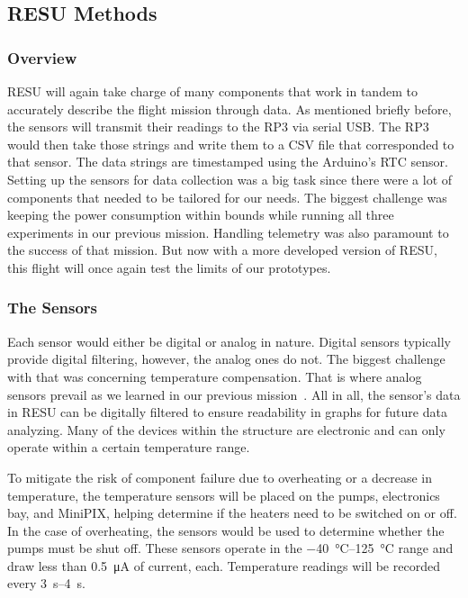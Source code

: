 \subsection{RESU Methods}
\label{sec:RESU}


\subsubsection{Overview}

RESU will again take charge of many components that work in tandem to accurately describe the flight mission through data.  As mentioned briefly before, the sensors will transmit their readings to the RP3 via serial USB.  The RP3 would then take those strings and write them to a CSV file that corresponded to that sensor.  The data strings are timestamped using the Arduino's RTC sensor.  Setting up the sensors for data collection was a big task since there were a lot of components that needed to be tailored for our needs.  The biggest challenge was keeping the power consumption within bounds while running all three experiments in our previous mission.  Handling telemetry was also paramount to the success of that mission.  But now with a more developed version of RESU, this flight will once again test the limits of our prototypes.

\subsubsection{The Sensors}

Each sensor would either be digital or analog in nature.  Digital sensors typically provide digital filtering, however, the analog ones do not.  The biggest challenge with that was concerning temperature compensation.  That is where analog sensors prevail as we learned in our previous mission~\cite{SORA}.  All in all, the sensor's data in RESU can be digitally filtered to ensure readability in graphs for future data analyzing.  Many of the devices within  the structure are electronic and can only operate within a certain temperature range.
   
To mitigate the risk of component failure due to overheating or a decrease in temperature, the temperature sensors will be placed on the pumps, electronics bay, and MiniPIX, helping determine if the heaters need to be switched on or off.  In the case of overheating, the sensors would be used to determine whether the pumps must be shut off.  These sensors operate in the \SIrange{-40}{125}{\celsius} range and draw less than \SI{0.5}{\micro\ampere} of current, each.  Temperature readings will be recorded every \SIrange{3}{4}{\second}.

